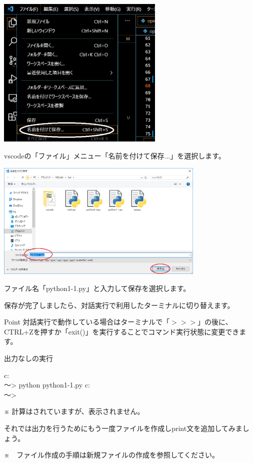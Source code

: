 \documentclass[11pt,a4paper,dvipdfmx,titlepage]{jsreport}
\begin{document}
\includegraphics[width=8cm]{images/image4.png}

vscodeの「ファイル」メニュー「名前を付けて保存...」を選択します。

\includegraphics[width=10cm]{images/image13.png}

ファイル名「python1-1.py」と入力して保存を選択します。

保存が完了しましたら、{\gt 対話実行}で利用したターミナルに切り替えます。

\begin{hipoint}{Point}
{\gt 対話実行}で動作している場合はターミナルで「$>>>　$」の後に、CTRL+Zを押すか「exit()」を実行することでコマンド実行状態に変更できます。
\end{hipoint}
\begin{grabox}{出力なしの実行}
\begin{listing}{1}
c:\\～> python python1-1.py
c:\\～>
\end{listing}
\end{grabox}
※ 計算はされていますが、表示されません。

それでは出力を行うためにもう一度ファイルを作成しprint文を追加してみましょう。

※　ファイル作成の手順は新規ファイルの作成を参照してください。
\end{document}
